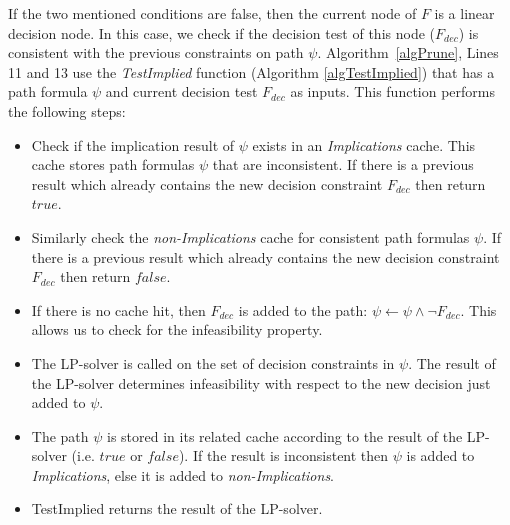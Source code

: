 \documentclass[twoside,11pt]{article}
\begin{document}
If the two mentioned conditions are false, then the current node of $F$ is a linear decision node. In this case, we check if the decision test of this node ($F_\mathit{dec}$) is consistent with the previous constraints on path $\psi$. 
Algorithm~\ref{algPrune}, Lines 11 and 13 use the \emph{TestImplied} function (Algorithm \ref{algTestImplied}) that has a  path formula  $\psi$ and current decision test $F_\mathit{dec}$ as inputs. This function performs the following steps:

\begin{itemize}
\item Check if the implication result of $\psi$ exists in an \emph{Implications} cache. This cache stores path formulas $\psi$ that are inconsistent. If there is a previous result which already contains the new decision constraint $F_\mathit{dec}$ then return $\mathit{true}$.
\item Similarly check the \emph{non-Implications} cache for consistent path formulas $\psi$. If there is a previous result which already contains the new decision constraint $F_\mathit{dec}$ then return $\mathit{false}$.
\item If there is no cache hit, then $F_\mathit{dec}$ is added to the path: $\psi \longleftarrow \psi \wedge \neg F_\mathit{dec}$. This allows us to check for the infeasibility property.
\item The LP-solver is called on the set of decision constraints in $\psi$. The result of the LP-solver determines infeasibility with respect to the new decision just added to $\psi$. 
\item The path $\psi$ is stored in its related cache according to the result of the LP-solver (i.e. $\mathit{true}$ or $\mathit{false}$). If the result is inconsistent then $\psi$ is added to \emph{Implications}, else it is added to \emph{non-Implications}.
\item TestImplied returns the result of the LP-solver.
\end{itemize}
\end{document}
